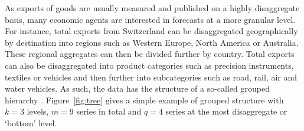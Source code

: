 \documentclass[a4paper,fleqn,11pt]{article}
\begin{document}
As exports of goods are usually measured and published on a highly disaggregate basis, many economic agents are interested in forecasts at a more granular level. For instance, total exports from Switzerland can be disaggregated geographically by destination into regions such as Western Europe, North America or Australia. These regional aggregates can then be divided further by country. Total exports can also be disaggregated into product categories such as precision instruments, textiles or vehicles and then further into subcategories such as road, rail, air and water vehicles. As such, the data has the structure of a so-called grouped hierarchy \citep[see][and references therein]{Hyndman2018}. Figure~\ref{fig:tree} gives a simple example of grouped structure with $k = 3$ levels, $m = 9$ series in total and $q = 4$ series at the most disaggregate or `bottom' level.
\end{document}
